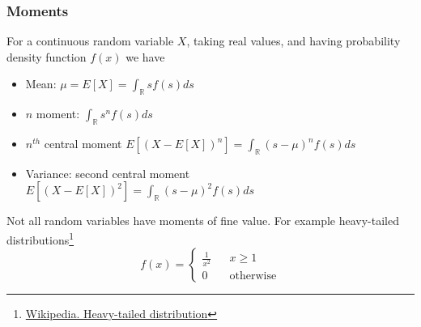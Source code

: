 \begin{frame}
	\frametitle{Moments}
	For a continuous random variable $X$, taking real values, and having probability density function $f(x)$ we have
	\begin{itemize}
		\item Mean: $\mu=E[X]=\int_\mathbb{R} sf(s)ds$
		\item $n$ moment: $\int_\mathbb{R} s^nf(s)ds$ 
		\item $n^{th}$ central moment $E[(X-E[X])^n]=\int_\mathbb{R} (s-\mu)^nf(s)ds$
		\item Variance: second central moment $E[(X-E[X])^2]=\int_\mathbb{R} (s-\mu)^2f(s)ds$
	\end{itemize}
	
	\vspace{1em}
	Not all random variables have moments of fine value. For example heavy-tailed distributions\footnote{\href{https://en.wikipedia.org/wiki/Heavy-tailed_distribution}{\small{ Wikipedia. Heavy-tailed distribution}}} 
	$$f(x)=\left\{\begin{aligned}
					\frac{1}{x^2} && x \geq 1\\
					0&&\textrm{otherwise}
				   \end{aligned}
	\right.$$
\end{frame}

